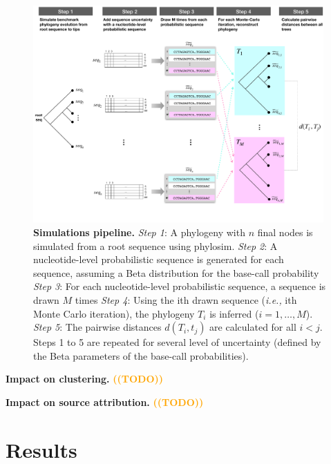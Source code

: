 \documentclass[10pt]{article}
\newcommand{\warning}[1]{\textbf{\textcolor{orange}{((#1))}}}
\newcommand{\ie}{\textit{i.e.,}\xspace}
\newcommand{\nlps}{nucleotide-level probabilistic sequence\xspace}
\begin{document}
\begin{figure}[ht]
\centering
    \includegraphics[width=0.99\textwidth]{figs/pipeline.pdf}
\caption{\textbf{Simulations pipeline.} 
\textit{Step 1}: A phylogeny with $n$ final nodes is simulated from a root sequence using \textsf{phylosim}.
\textit{Step 2}: A \nlps is generated for each sequence, assuming a Beta distribution for the base-call probability
\textit{Step 3}: For each \nlps, a sequence is drawn $M$ times
\textit{Step 4}: Using the ith drawn sequence (\ie ith Monte Carlo iteration), the phylogeny $T_i$ is inferred ($i=1,\ldots,M$). 
\textit{Step 5}: The pairwise distances $d(T_i, t_j)$ are calculated for all $i<j$.
Steps 1 to 5 are repeated for several level of uncertainty (defined by the Beta parameters of the base-call probabilities).
}
\label{fig:pipeline}
\end{figure}


\textbf{Impact on clustering.}
\warning{TODO}

\textbf{Impact on source attribution.}
\warning{TODO}







\section{Results}

\newpage

\end{document}
